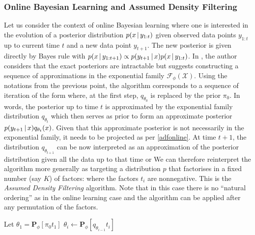 \subsubsection*{Online Bayesian Learning and Assumed Density Filtering}
%
Let us consider the context of online Bayesian learning where one is interested in the evolution of a posterior distribution $p(x\,|\, y_{1:t})$ given observed \iid{} data points $y_{1:t}$ up to current time $t$ and a new \iid data point $y_{t+1}$. The new posterior is given directly by Bayes rule with $p(x\,|\, y_{1:t+1})\propto p(y_{t+1}\,|\, x) p(x\,|\, y_{1:t})$. In \citet{opper98}, the author considers that the exact posteriors are intractable but suggests constructing a sequence of approximations in the exponential family $\mathcal F_{\phi}(\mathcal X)$. Using the notations from the previous point, the algorithm corresponds to a sequence of iteration of the form
where, at the first step, $q_{\theta_{0}}$ is replaced by the prior $\pi_{0}$. In words, the posterior up to time $t$ is approximated by the exponential family distribution $q_{\theta_{t}}$ which then serves as prior to form an approximate posterior $p(y_{t+1}\,|\, x)q_{\theta_{t}}(x)$. Given that this approximate posterior is not necessarily in the exponential family, it needs to be projected as per \eqref{adfonline}. At time $t+1$, the distribution $q_{\theta_{t+1}}$ can be now interpreted as an approximation of the posterior distribution given all the data up to that time or 
%
%
We can therefore reinterpret the algorithm more generally as targeting a distribution $p$ that factorises in a fixed number (say $K$) of factors: 
%
%
where the factors $t_i$ are nonnegative. This is the \emph{Assumed Density Filtering} algorithm. Note that in this case there is no ``natural ordering'' as in the online learning case and the algorithm can be applied after any permutation of the factors.

\begin{algorithm}[!h]\small
	\caption{\label{alg:adf}}
	\begin{algorithmic}[1]
	\State Let $\theta_{1}=\mathbf P_{\phi}[\pi_{0}t_{1}]$
		\State $\theta_{i}\leftarrow\mathbf P_{\phi}[q_{\theta_{i-1}}t_{i}]$ 
	\EndFor\\
	\end{algorithmic}
\end{algorithm} 

